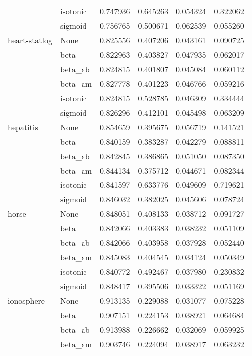 \begin{tabular}{llrrrr}
        & isotonic &  0.747936 &  0.645263 &  0.054324 &  0.322062 \\
        & sigmoid &  0.756765 &  0.500671 &  0.062539 &  0.055260 \\
heart-statlog & None &  0.825556 &  0.407206 &  0.043161 &  0.090725 \\
        & beta &  0.822963 &  0.403827 &  0.047935 &  0.062017 \\
        & beta\_ab &  0.824815 &  0.401807 &  0.045084 &  0.060112 \\
        & beta\_am &  0.827778 &  0.401223 &  0.046766 &  0.059216 \\
        & isotonic &  0.824815 &  0.528785 &  0.046309 &  0.334444 \\
        & sigmoid &  0.826296 &  0.412101 &  0.045498 &  0.063209 \\
hepatitis & None &  0.854659 &  0.395675 &  0.056719 &  0.141521 \\
        & beta &  0.840159 &  0.383287 &  0.042279 &  0.088811 \\
        & beta\_ab &  0.842845 &  0.386865 &  0.051050 &  0.087350 \\
        & beta\_am &  0.844134 &  0.375712 &  0.044671 &  0.082344 \\
        & isotonic &  0.841597 &  0.633776 &  0.049609 &  0.719621 \\
        & sigmoid &  0.846032 &  0.382025 &  0.045606 &  0.078724 \\
horse & None &  0.848051 &  0.408133 &  0.038712 &  0.091727 \\
        & beta &  0.842066 &  0.403383 &  0.038232 &  0.051109 \\
        & beta\_ab &  0.842066 &  0.403958 &  0.037928 &  0.052440 \\
        & beta\_am &  0.845083 &  0.404545 &  0.034124 &  0.050349 \\
        & isotonic &  0.840772 &  0.492467 &  0.037980 &  0.230832 \\
        & sigmoid &  0.848417 &  0.395506 &  0.033322 &  0.051169 \\
ionosphere & None &  0.913135 &  0.229088 &  0.031077 &  0.075228 \\
        & beta &  0.907151 &  0.224153 &  0.038921 &  0.064684 \\
        & beta\_ab &  0.913988 &  0.226662 &  0.032069 &  0.059925 \\
        & beta\_am &  0.903746 &  0.224094 &  0.038917 &  0.063232 \\

\end{tabular}
